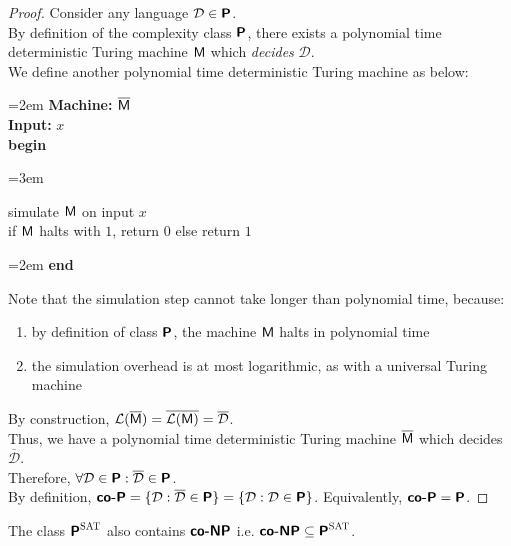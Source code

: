 \documentclass[usletter]{article}
\newcommand {\langset}[1]      {\ensuremath{\mathcal{#1}}}
\newcommand {\namedlangset}[1] {\ensuremath{\textnormal{\textsc{#1}}}}
\newcommand {\machine}[1]      {\ensuremath{\textnormal{\textsf{#1}}}}
\newcommand {\family}[1]       {\ensuremath{\textnormal{\textsf{\textbf{#1}}}}}
\newenvironment{turing}[2]{
  \par\smallskip\leftskip=2em
  \noindent\ignorespaces
  \textbf{Machine:} #1\\
  \textbf{Input:} #2\\[5pt]
  \textbf{begin}
  \par\leftskip=3em
  \noindent\ignorespaces
}{
  \par\leftskip=2em
  \noindent\ignorespaces
  \textbf{end}
  \par\medskip
}
\begin{document}
\begin{proof}
Consider any language $\langset{D} \in \family{P}$. \\
By definition of the complexity class \family{P}, there exists a polynomial time
deterministic Turing machine \machine{M} which \textit{decides} \langset{D}. \\

\noindent
We define another polynomial time deterministic Turing machine as below:
\begin{turing}{$\overline{\machine{M}}$}{$x$}
  simulate \machine{M} on input $x$ \\
  if \machine{M} halts with $1$, return $0$ else return $1$
\end{turing}

\noindent
Note that the simulation step cannot take longer than polynomial time, because:
\begin{enumerate}
  \item by definition of class \family{P},
    the machine \machine{M} halts in polynomial time
  \item the simulation overhead is at most logarithmic,
    as with a universal Turing machine
\end{enumerate}

\noindent
By construction, $\langset{L}(\overline{\machine{M}})
                 = \overline{\langset{L}(\machine{M})}
                 = \overline{\langset{D}}$. \\
Thus, we have a polynomial time deterministic Turing machine
$\overline{\machine{M}}$ which decides $\overline{\langset{D}}$. \\

\noindent
Therefore, $\forall \langset{D} \in \family{P}
  : \overline{\langset{D}} \in \family{P}$. \\
By definition, $\family{co-P}
  = \{\langset{D} : \overline{\langset{D}} \in \family{P} \}
  = \{\langset{D} : \langset{D} \in \family{P} \}$.
Equivalently, $\family{co-P} = \family{P}$.
\end{proof}

\begin{proposition}
The class $\family{P}^\namedlangset{SAT}$ also contains \family{co-NP}
i.e. $\family{co-NP} \subseteq \family{P}^\namedlangset{SAT}$.
\end{proposition}
\end{document}
